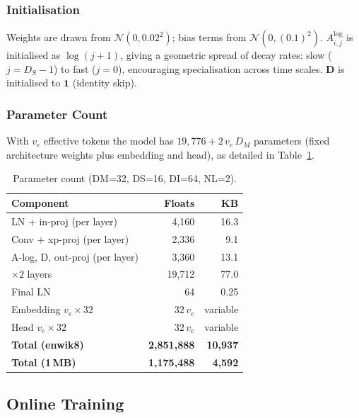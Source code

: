 \documentclass[10pt,twocolumn]{article}
\begin{document}
\subsubsection{Initialisation}

Weights are drawn from $\mathcal{N}(0,0.02^2)$; bias terms from
$\mathcal{N}(0,(0.1)^2)$.
$A^\text{log}_{i,j}$ is initialised as $\log(j+1)$, giving a geometric
spread of decay rates: slow ($j=D_S-1$) to fast ($j=0$), encouraging
specialisation across time scales.
$\mathbf{D}$ is initialised to $\mathbf{1}$ (identity skip).

\subsubsection{Parameter Count}

With $v_e$ effective tokens the model has
$19{,}776 + 2\,v_e\,D_M$ parameters (fixed architecture weights plus
embedding and head), as detailed in Table~\ref{tab:params}.

\begin{table}[h]
\centering
\small
\caption{Parameter count (DM=32, DS=16, DI=64, NL=2).}
\label{tab:params}
\begin{tabular}{@{}lrr@{}}
\toprule
\textbf{Component} & \textbf{Floats} & \textbf{KB} \\
\midrule
LN + in-proj (per layer)       & 4,160 & 16.3 \\
Conv + xp-proj (per layer)     & 2,336 & 9.1  \\
A-log, D, out-proj (per layer) & 3,360 & 13.1 \\
$\times 2$ layers              & 19,712 & 77.0 \\
Final LN                       & 64    & 0.25 \\
\midrule
Embedding $v_e\times32$        & $32\,v_e$ & variable \\
Head $v_e\times32$             & $32\,v_e$ & variable \\
\midrule
\textbf{Total (enwik8)} & \textbf{2,851,888} & \textbf{10,937} \\
\textbf{Total (1\,MB)} & \textbf{1,175,488} & \textbf{4,592} \\
\bottomrule
\end{tabular}
\end{table}

\subsection{Online Training}
\label{sec:training}
\end{document}
